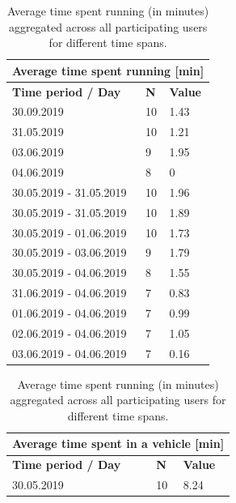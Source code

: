 \begin{table}[]
	\parbox{.40\linewidth}{
		\centering
		\begin{tabular}{|l|l|l|}
			\hline
			\multicolumn{3}{|c|}{\textbf{Average time spent running {[}min{]}}}          \\ \hline
			\textbf{Time period / Day} & \textbf{N} & \textbf{Value} \\ \hline
			30.09.2019                 & 10         & 1.43                     \\ \hline
			31.05.2019                 & 10         & 1.21                     \\ \hline
			03.06.2019                 & 9          & 1.95                     \\ \hline
			04.06.2019                 & 8          & 0                        \\ \hline
			30.05.2019 - 31.05.2019    & 10         & 1.96                     \\ \hline
			30.05.2019 - 31.05.2019    & 10         & 1.89                     \\ \hline
			30.05.2019 - 01.06.2019    & 10         & 1.73                     \\ \hline
			30.05.2019 - 03.06.2019    & 9          & 1.79                     \\ \hline
			30.05.2019 - 04.06.2019    & 8          & 1.55                     \\ \hline
			31.06.2019 - 04.06.2019    & 7          & 0.83                     \\ \hline
			01.06.2019 - 04.06.2019    & 7          & 0.99                     \\ \hline
			02.06.2019 - 04.06.2019    & 7          & 1.05                     \\ \hline
			03.06.2019 - 04.06.2019    & 7          & 0.16                     \\ \hline
		\end{tabular}
		\caption{Average time spent running (in minutes) aggregated across all participating users for different time spans.}
		\label{results-running}
	}
	\hfill
	\parbox{.50\linewidth}{
		\begin{tabular}{|l|l|l|}
			\hline
			\multicolumn{3}{|c|}{\textbf{Average time spent in a vehicle {[}min{]}}}     \\ \hline
			\textbf{Time period / Day} & \textbf{N} & \textbf{Value} \\ \hline
			30.05.2019                 & 10         & 8.24                     \\ \hline

\end{tabular}}
\end{table}
